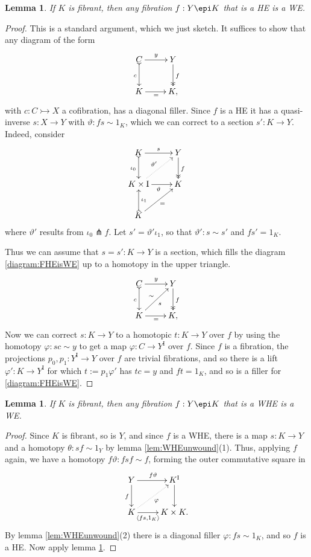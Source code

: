 \documentclass[11pt]{article}
\newcommand{\mono}{\ensuremath{\rightarrowtail}}
\newcommand{\ra}{\ensuremath{\rightarrow}}
\newcommand{\I}{\ensuremath{\mathrm{I}}}
\newtheorem{lemma}[theorem]{Lemma}
\theoremstyle{remark}
\theoremstyle{definition}
\begin{document}
\begin{lemma}\label{FibHETrivFib}
If $K$ is fibrant, then any fibration $f : Y \epi K$ that is a HE is a WE.
\end{lemma}
\begin{proof}
This is a standard argument, which we just sketch.  It suffices to show that any diagram of the form
\begin{equation}\label{diagram:FHEisWE}
\xymatrix{
C \ar@{>->}[d]_{c} \ar[r]^y & Y \ar@{>>}[d]^{f} \\
K\ar[r]_{=} & K,
}
\end{equation}
with  $c : C \mono X$  a cofibration, has a diagonal filler.  
Since $f$ is a HE it has a quasi-inverse $s:X\ra Y$ with $\vartheta : fs\sim 1_K$, which we can correct to a section $s' : K\ra Y$. 
Indeed, consider 
\begin{equation*}%
\xymatrix{
K \ar@{>->}[d]_{\iota_0} \ar[r]^{s}  & Y\ar@{>>}[d]^{f} \\
K\times \I \ar[r]_{\vartheta} \ar@{..>}[ru]^{\vartheta'}& K\\
K \ar@{>->}[u]_{\iota_1} \ar[ru]_=&
}
\end{equation*}
where $\vartheta' $ results from $\iota_0 \pitchfork f$. Let $s' = \vartheta' \iota_1$, so that $\vartheta' : s\sim s'$ and $fs' = 1_K$.

Thus we can assume that $s = s' : K\ra Y$ is a section, which fills the diagram \eqref{diagram:FHEisWE} up to a homotopy in the upper triangle.
\begin{equation*}%
\xymatrix{
C \ar@{>->}[d]_{c} \ar[r]^y & Y \ar@{>>}[d]^{f} \\
K\ar[r]_{=} \ar[ru]_{s}^{\sim} & K,
}
\end{equation*}
Now we can correct $s: K\ra Y$ to a homotopic $t : K\ra Y$ over $f$ by using the homotopy $\varphi : sc\sim y$  to get a map $\varphi : C\ra Y^\I$ over $f$.  Since $f$ is a fibration, the projections $p_0, p_1:Y^\I \ra Y$ over $f$ are trivial fibrations, and so there is a lift $\varphi': K\ra Y^\I$ for which $t:= p_1\varphi'$ has $tc= y$ and $ft=1_K$, and so is a filler for \eqref{diagram:FHEisWE}.
\end{proof}

\begin{lemma}\label{FibWHEfibCodTrivFib}
If $K$ is fibrant, then any fibration $f : Y \epi K$ that is a WHE is a WE.
\end{lemma}
\begin{proof}
Since $K$ is fibrant, so is $Y$, and since $f$ is a WHE, there is a map $s : K\ra Y$ and a homotopy $\theta: sf \sim 1_Y$ by lemma \ref{lem:WHEunwound}(1).  Thus, applying $f$ again, we have a homotopy $f\vartheta: fsf \sim f$, forming the outer commutative square in
\[
\xymatrix{
Y \ar[d]_{f} \ar[r]^{f\vartheta}  & K^\I \ar[d] \\
K \ar@{..>}[ru]_{\varphi} \ar[r]_-{\langle fs, 1_K\rangle} & K\times K.
}
\]
By lemma \ref{lem:WHEunwound}(2) there is a diagonal filler $\varphi : fs\sim 1_K$, and so $f$ is a HE. Now apply lemma \ref{FibHETrivFib}.
\end{proof}
\end{document}
